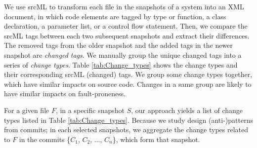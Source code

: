 \begin{table*}[ht]   
\caption{Change types identified from the source code of the systems studied}
\label{tab:Change_types}
\begin{center}
\end{center}
\end{table*} 

We use srcML \cite{srcml} to transform each file in the snapshots of a system into an XML document, in which code elements are tagged by type or function, \eg{} a class declaration, a parameter list, or a control flow statement. Then, we compare the srcML tags between each two subsequent snapshots and extract their differences. The removed tags from the older snapshot and the added tags in the newer snapshot are \emph{changed tags}. We manually group the unique changed tags into a series of \emph{change types}. Table \ref{tab:Change_types} shows the change types and their corresponding srcML (changed) tags. We group some change types together, which have similar impacts on source code. Changes in a same group are likely to have similar impacts on fault-proneness. 

For a given file $F$, in a specific snapshot $S$, our approach yields a list of change types listed in Table \ref{tab:Change_types}. Because we study design (anti-)patterns from commits; in each selected snapshots, we aggregate the change types related to $F$ in the commits \{$C_1$, $C_2$, ..., $C_n$\}, which form that snapshot. 